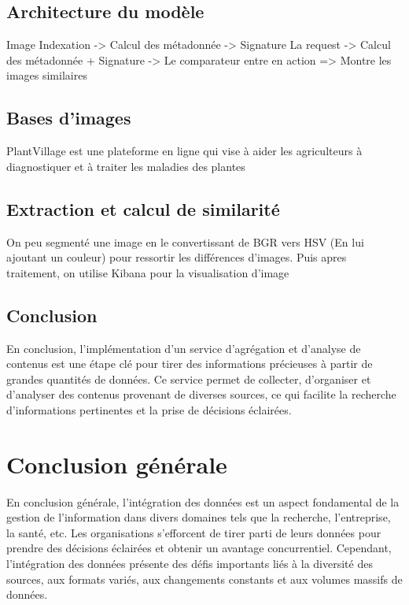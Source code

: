 \documentclass{article}
\begin{document}
	
	\subsection{Architecture du modèle}
	Image Indexation -> Calcul des métadonnée -> Signature
	La request -> Calcul des métadonnée  + Signature -> Le comparateur entre en action => Montre les images similaires
	
	\subsection{Bases d’images}
	PlantVillage
	est une plateforme en ligne qui vise à aider les agriculteurs à diagnostiquer et à traiter les maladies des
	plantes
	
	\subsection{Extraction et calcul de similarité}
	
	On peu segmenté une image en le convertissant de BGR vers HSV (En lui ajoutant un couleur) pour ressortir les différences d'images.
	Puis apres traitement, on utilise Kibana pour  la visualisation d'image
	
	\subsection{Conclusion}
	En conclusion, l’implémentation d’un service d’agrégation et d’analyse de contenus est une
	étape clé pour tirer des informations précieuses à partir de grandes quantités de données. Ce service
	permet de collecter, d’organiser et d’analyser des contenus provenant de diverses sources, ce qui
	facilite la recherche d’informations pertinentes et la prise de décisions éclairées.
	
	
	\section{Conclusion générale}
	En conclusion générale, l’intégration des données est un aspect fondamental de la gestion de l’information dans divers domaines tels que la recherche, l’entreprise, la santé, etc. Les organisations s’efforcent de tirer parti de leurs données pour prendre des décisions éclairées et obtenir un avantage concurrentiel. Cependant, l’intégration des données présente des défis importants liés à la diversité des sources, aux formats variés, aux changements constants et aux volumes massifs de données.
	
\end{document}
